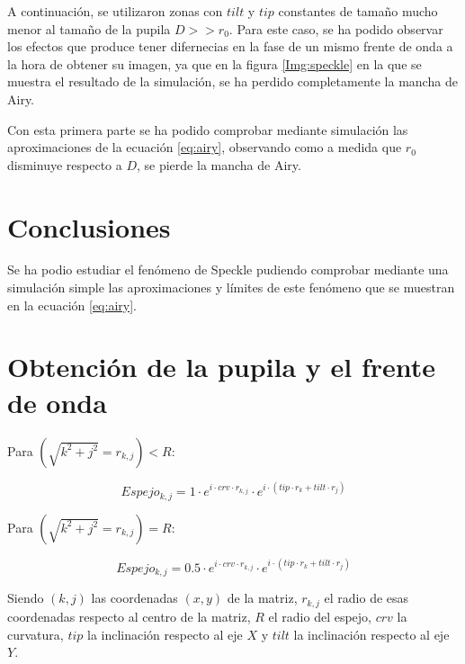 \documentclass[twoside]{article}
\begin{document}
			A continuación, se utilizaron zonas con $tilt$ y $tip$ constantes de tamaño mucho menor al tamaño de la pupila $D >> r_0$. Para este caso, se ha podido observar los efectos que produce tener difernecias en la fase de un mismo frente de onda a la hora de obtener su imagen, ya que en la figura \ref{Img:speckle} en la que se muestra el resultado de la simulación, se ha perdido completamente la mancha de Airy.

			Con esta primera parte se ha podido comprobar mediante simulación las aproximaciones de la ecuación \ref{eq:airy}, observando como a medida que $r_0$ disminuye respecto a $D$, se pierde la mancha de Airy.

		\section{Conclusiones}

			Se ha podio estudiar el fenómeno de Speckle pudiendo comprobar mediante una simulación simple las aproximaciones y límites de este fenómeno que se muestran en la ecuación \ref{eq:airy}.




	    \appendix

		    	\section{Obtención de la pupila y el frente de onda}
		    		\label{appen:Espejo}

					Para  $(\sqrt{k^2+j^2}=r_{k,j}) < R$:

						\begin{equation}
							Espejo_{k, j} = 1 \cdot e^{i\cdot crv \cdot r_{k,j}} \cdot e^{i\cdot (tip\cdot r_k + tilt \cdot r_j)}
						\end{equation}
						
					Para $(\sqrt{k^2+j^2}=r_{k,j}) = R$:

						\begin{equation}
							Espejo_{k,j} = 0.5 \cdot e^{i\cdot crv \cdot r_{k,j}} \cdot e^{i\cdot (tip\cdot r_k + tilt \cdot r_j)}
							\label{eq:Espejo}
						\end{equation}	

					Siendo $(k, j)$ las coordenadas $(x, y)$ de la matriz, $r_{k, j}$ el radio de esas coordenadas respecto al centro de la matriz, $R$ el radio del espejo, $crv$ la curvatura, $tip$ la inclinación respecto al eje $X$ y $tilt$ la inclinación respecto al eje $Y$.
	    		

	
	
\end{document}

